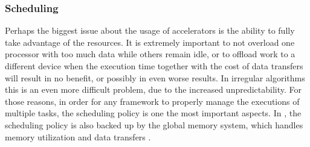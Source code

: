 \documentclass[main.tex]{subfiles}
\begin{document}
\subsubsection{Scheduling}

Perhaps the biggest issue about the usage of accelerators is the ability to fully take advantage of the resources. It is extremely important to not overload one processor with too much data while others remain idle, or to offload work to a different device when the execution time together with the cost of data transfers will result in no benefit, or possibly in even worse results. In irregular algorithms this is an even more difficult problem, due to the increased unpredictability.
For those reasons, in order for any \hetplat framework to properly manage the executions of multiple tasks, the scheduling policy is one the most important aspects. In \gama, the scheduling policy is also backed up by the global memory system, which handles memory utilization and data transfers \cite{thesisMariano12,artur2012gama,ricardo2012gama}.
\end{document}
